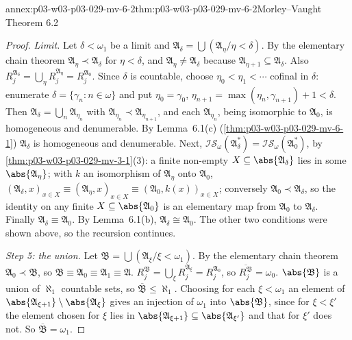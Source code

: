 \begin{annexitem}{annex:p03-w03-p03-029-mv-6-2}{thm:p03-w03-p03-029-mv-6-2}{Morley--Vaught Theorem 6.2}
\begin{proof}
\emph{Limit.} Let \(\delta<\omega_1\) be a limit and
\(\mathfrak A_\delta=\bigcup(\mathfrak A_\eta/\eta<\delta)\). By the
elementary chain theorem \(\mathfrak A_\eta\prec\mathfrak A_\delta\) for
\(\eta<\delta\), and \(\mathfrak A_\eta\neq\mathfrak A_\delta\) because
\(\mathfrak A_{\eta+1}\subseteq\mathfrak A_\delta\). Also
\(R_j^{\mathfrak A_\delta}=\bigcup_\eta R_j^{\mathfrak A_\eta}=R_j^{\mathfrak
A_0}\). Since \(\delta\) is countable, choose
\(\eta_0<\eta_1<\cdots\) cofinal in \(\delta\): enumerate
\(\delta=\{\gamma_n:n\in\omega\}\) and put \(\eta_0=\gamma_0\),
\(\eta_{n+1}=\max(\eta_n,\gamma_{n+1})+1<\delta\). Then \(\mathfrak
A_\delta=\bigcup_n\mathfrak A_{\eta_n}\) with \(\mathfrak
A_{\eta_n}\prec\mathfrak A_{\eta_{n+1}}\), and each \(\mathfrak A_{\eta_n}\),
being isomorphic to \(\mathfrak A_0\), is homogeneous and denumerable. By
Lemma~6.1(c) (\cref{thm:p03-w03-p03-029-mv-6-1}) \(\mathfrak A_\delta\) is
homogeneous and denumerable. Next, \(\mathscr I\mathscr S_\omega(\mathfrak
A_\delta^*)=\mathscr I\mathscr S_\omega(\mathfrak A_0^*)\), by
\cref{thm:p03-w03-p03-029-mv-3-1}(3): a finite non-empty
\(X\subseteq\abs{\mathfrak A_\delta}\) lies in some \(\abs{\mathfrak
A_\eta}\); with \(k\) an isomorphism of \(\mathfrak A_\eta\) onto
\(\mathfrak A_0\), \((\mathfrak A_\delta,x)_{x\in X}\equiv(\mathfrak
A_\eta,x)_{x\in X}\equiv(\mathfrak A_0,k(x))_{x\in X}\); conversely
\(\mathfrak A_0\prec\mathfrak A_\delta\), so the identity on any finite
\(X\subseteq\abs{\mathfrak A_0}\) is an elementary map from \(\mathfrak
A_0\) to \(\mathfrak A_\delta\). Finally \(\mathfrak A_\delta\equiv\mathfrak
A_0\). By Lemma~6.1(b), \(\mathfrak A_\delta\cong\mathfrak A_0\). The other
two conditions were shown above, so the recursion continues.

\emph{Step 5: the union.} Let \(\mathfrak B=\bigcup(\mathfrak
A_\xi/\xi<\omega_1)\). By the elementary chain theorem \(\mathfrak
A_0\prec\mathfrak B\), so \(\mathfrak B\equiv\mathfrak A_0\equiv\mathfrak
A_1\equiv\mathfrak A\). \(R_j^{\mathfrak B}=\bigcup_\xi R_j^{\mathfrak
A_\xi}=R_j^{\mathfrak A_0}\), so \(\overline{R_j^{\mathfrak B}}=\omega_0\).
\(\abs{\mathfrak B}\) is a union of \(\aleph_1\) countable sets, so
\(\overline{\mathfrak B}\leq\aleph_1\). Choosing for each \(\xi<\omega_1\) an
element of \(\abs{\mathfrak A_{\xi+1}}\setminus\abs{\mathfrak A_\xi}\) gives an
injection of \(\omega_1\) into \(\abs{\mathfrak B}\), since for
\(\xi<\xi'\) the element chosen for \(\xi\) lies in \(\abs{\mathfrak
A_{\xi+1}}\subseteq\abs{\mathfrak A_{\xi'}}\) and that for \(\xi'\) does not.
So \(\overline{\mathfrak B}=\omega_1\).
\end{proof}
\end{annexitem}
